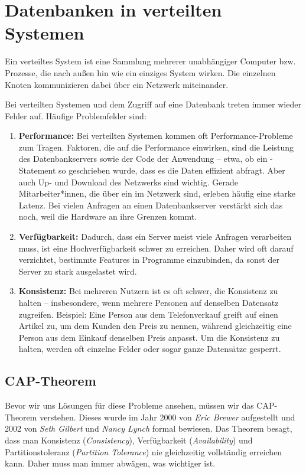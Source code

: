 \section{Datenbanken in verteilten Systemen}
\begin{infobox}
Ein verteiltes System ist eine Sammlung mehrerer unabhängiger Computer bzw. Prozesse, die nach außen hin wie ein einziges System wirken. Die einzelnen Knoten kommunizieren dabei über ein Netzwerk miteinander.
\end{infobox}

Bei verteilten Systemen und dem Zugriff auf eine Datenbank treten immer wieder Fehler auf. Häufige Problemfelder sind:

\begin{enumerate}[leftmargin=*]
  \item \textbf{Performance:} Bei verteilten Systemen kommen oft Performance-Probleme zum Tragen. Faktoren, die auf die Performance einwirken, sind die Leistung des Datenbankservers sowie der Code der Anwendung -- etwa, ob ein -Statement so geschrieben wurde, dass es die Daten effizient abfragt. Aber auch Up- und Download des Netzwerks sind wichtig. Gerade Mitarbeiter*innen, die über ein  im Netzwerk sind, erleben häufig eine starke Latenz. Bei vielen Anfragen an einen Datenbankserver verstärkt sich das noch, weil die Hardware an ihre Grenzen kommt.
  \item \textbf{Verfügbarkeit:} Dadurch, dass ein Server meist viele Anfragen verarbeiten muss, ist eine Hochverfügbarkeit schwer zu erreichen. Daher wird oft darauf verzichtet, bestimmte Features in Programme einzubinden, da sonst der Server zu stark ausgelastet wird.
  \item \textbf{Konsistenz:} Bei mehreren Nutzern ist es oft schwer, die Konsistenz zu halten -- insbesondere, wenn mehrere Personen auf denselben Datensatz zugreifen. Beispiel: Eine Person aus dem Telefonverkauf greift auf einen Artikel zu, um dem Kunden den Preis zu nennen, während gleichzeitig eine Person aus dem Einkauf denselben Preis anpasst. Um die Konsistenz zu halten, werden oft einzelne Felder oder sogar ganze Datensätze gesperrt.
\end{enumerate}

\subsection{CAP-Theorem}
Bevor wir uns Lösungen für diese Probleme ansehen, müssen wir das CAP-Theorem verstehen. Dieses wurde im Jahr 2000 von \emph{Eric Brewer} aufgestellt und 2002 von \emph{Seth Gilbert} und \emph{Nancy Lynch} formal bewiesen. Das Theorem besagt, dass man Konsistenz (\emph{Consistency}), Verfügbarkeit (\emph{Availability}) und Partitionstoleranz (\emph{Partition Tolerance}) nie gleichzeitig vollständig erreichen kann. Daher muss man immer abwägen, was wichtiger ist.

